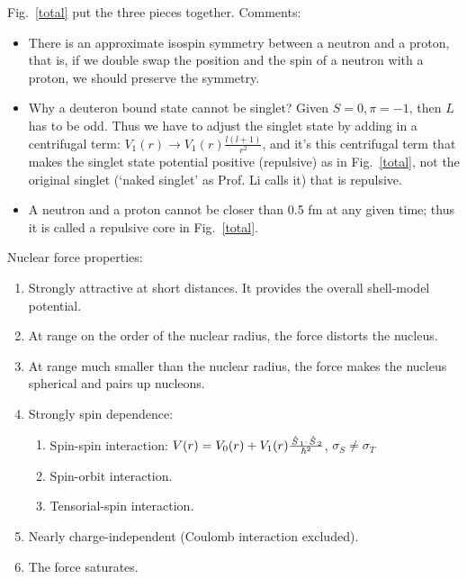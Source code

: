 \documentclass{school-22.101-notes}
\begin{document}
Fig.~\ref{total} put the three pieces together. Comments:
\begin{itemize}
\item There is an approximate isospin symmetry between a neutron and a proton, that is, if we double swap the position and the spin of a neutron with a proton, we should preserve the symmetry. 

\item Why a deuteron bound state cannot be singlet? Given $S=0, \pi = -1$, then $L$ has to be odd. Thus we have to adjust the singlet state by adding in a centrifugal term: $V_1(r) \to V_1(r) \frac{l(l+1)}{r^2}$, and it's this centrifugal term that makes the singlet state potential positive (repulsive) as in Fig.~\ref{total}, not the original singlet (`naked singlet' as Prof. Li calls it) that is repulsive. 

\item A neutron and a proton cannot be closer than 0.5 fm at any given time; thus it is called a repulsive core in Fig.~\ref{total}. 
\end{itemize}



Nuclear force properties: 
\begin{enumerate}
\item Strongly attractive at short distances. It provides the overall shell-model potential.
\item At range on the order of the nuclear radius, the force distorts the nucleus. 
\item At range much smaller than the nuclear radius, the force makes the nucleus spherical and pairs up nucleons.
\item Strongly spin dependence:
    \begin{enumerate}
    \item Spin-spin interaction: $V(r) = V_0(r) + V_1 (r) \frac{\left. \hat{S} \right._1 \cdot \left. \hat{S} \right._2}{\hbar^2} $, $\sigma_S \neq \sigma_T$
    \item Spin-orbit interaction.
    \item Tensorial-spin interaction. 
    \end{enumerate}    
\item Nearly charge-independent (Coulomb interaction excluded).
\item The force saturates.
\end{enumerate}
\end{document}
